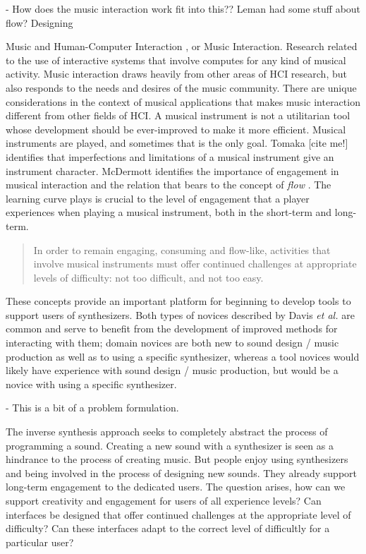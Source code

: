 - How does the music interaction work fit into this?? Leman had some stuff about flow? Designing 

Music and Human-Computer Interaction \cite{holland2013music}, or Music Interaction. Research related to the use of interactive systems that involve computes for any kind of musical activity. Music interaction draws heavily from other areas of HCI research, but also responds to the needs and desires of the music community. There are unique considerations in the context of musical applications that makes music interaction different from other fields of HCI. A musical instrument is not a utilitarian tool whose development should be ever-improved to make it more efficient. Musical instruments are played, and sometimes that is the only goal. Tomaka [cite me!] identifies that imperfections and limitations of a musical instrument give an instrument character. McDermott \cite{mcdermott2013should} identifies the importance of engagement in musical interaction and the relation that bears to the concept of \textit{flow} \cite{csikszentmihalyi1990flow}. The learning curve plays is crucial to the level of engagement that a player experiences when playing a musical instrument, both in the short-term and long-term.

\begin{quote}
    In order to remain engaging, consuming and flow-like, activities that involve musical instruments must offer continued challenges at appropriate levels of difficulty: not too difficult, and not too easy. 
\end{quote}

These concepts provide an important platform for beginning to develop tools to support users of synthesizers. Both types of novices described by Davis \textit{et al.} are common and serve to benefit from the development of improved methods for interacting with them; domain novices are both new to sound design / music production as well as to using a specific synthesizer, whereas a tool novices would likely have experience with sound design / music production, but would be a novice with using a specific synthesizer. 

- This is a bit of a problem formulation.

The inverse synthesis approach seeks to completely abstract the process of programming a sound. Creating a new sound with a synthesizer is seen as a hindrance to the process of creating music. But people enjoy using synthesizers and being involved in the process of designing new sounds. They already support long-term engagement to the dedicated users. The question arises, how can we support creativity and engagement for users of all experience levels? Can interfaces be designed that offer continued challenges at the appropriate level of difficulty? Can these interfaces adapt to the correct level of difficultly for a particular user?


